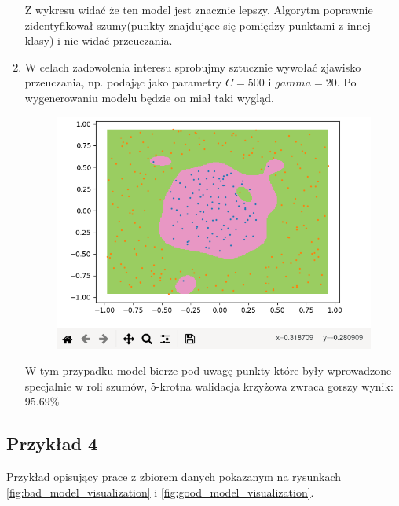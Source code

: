 \documentclass[paper=a4, fontsize=11pt]{scrartcl} %
\numberwithin{equation}{section} %
\numberwithin{figure}{section} %
\begin{document}
\begin{enumerate}[label={\textbf{Krok \theenumi :}},leftmargin=*]
    Z wykresu widać że ten model jest znacznie lepszy. Algorytm poprawnie zidentyfikował
    szumy(punkty znajdujące się pomiędzy punktami z innej klasy) i nie widać przeuczania. 


\item W celach zadowolenia interesu sprobujmy sztucznie wywołać zjawisko przeuczania, np.
    podając jako parametry $C=500$ i $gamma=20$. Po wygenerowaniu modelu będzie on miał
    taki wygląd.

    \begin{figure}[H]
        \begin{center}
            \includegraphics[scale=0.69]{./img/ex3_st7.png}
        \end{center}
    \end{figure}

    W tym przypadku model bierze pod uwagę punkty które były wprowadzone specjalnie w roli
    szumów, 5-krotna walidacja krzyżowa zwraca gorszy wynik: 95.69\%

\end{enumerate}

\subsection{Przykład 4}
    \par Przykład opisujący prace z zbiorem danych pokazanym na rysunkach
    \ref{fig:bad_model_visualization} i \ref{fig:good_model_visualization}.
\end{document}

